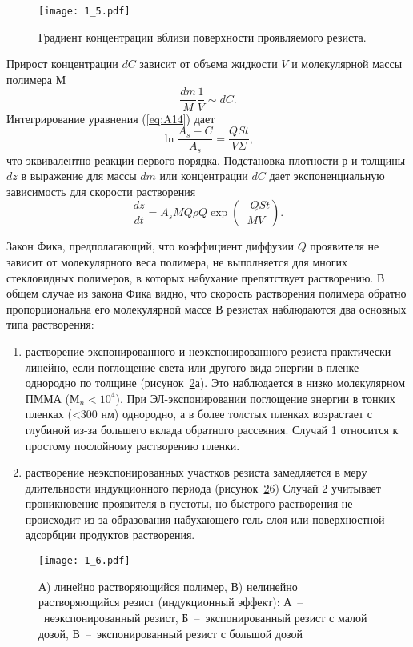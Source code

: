 \begin{figure}[H]
\center
\texttt{[image: 1\_5.pdf]}
\caption{Градиент концентрации вблизи поверхности проявляемого резиста.}
\label{fig:5}
\end{figure}

Прирост концентрации $dC$ зависит от объема жидкости $V$ и молекулярной массы полимера $М$
\begin{equation}
\frac{dm}{M}\frac{1}{V} \sim dC.
\label{eq:A15}
\end{equation}
Интегрирование уравнения (\ref{eq:A14}) дает
\begin{equation}
\ln\frac{A_s-C}{A_s} = \frac{QSt}{V\Sigma},
\label{eq:A16}
\end{equation}
что эквивалентно реакции первого порядка. Подстановка плотности $р$ и толщины $dz$ в выражение для массы $dm$ или концентрации $dC$ дает экспоненциальную зависимость для скорости растворения
\begin{equation}
\frac{dz}{dt} = A_s MQ \rho Q \exp\left(\frac{-QSt}{MV}\right).
\label{eq:A17}
\end{equation}

Закон Фика, предполагающий, что коэффициент диффузии $Q$ проявителя не зависит от молекулярного веса полимера, не выполняется для многих стекловидных полимеров, в которых набухание препятствует растворению.
В общем случае из закона Фика видно, что скорость растворения полимера обратно пропорциональна его молекулярной массе В резистах наблюдаются два основных типа растворения:
\begin{enumerate}
    \item растворение экспонированного и неэкспонированного резиста практически линейно, если поглощение света или другого вида энергии в пленке однородно по толщине (рисунок~\ref{fig:6}а). Это наблюдается в низко молекулярном ПММА ($М_n<10^4$). При ЭЛ-экспонировании поглощение энергии в тонких пленках (<300 нм) однородно, а в более толстых пленках возрастает с глубиной из-за большего вклада обратного рассеяния. Случай 1 относится к простому послойному растворению пленки.
    \item растворение неэкспонированных участков резиста замедляется в меру длительности индукционного периода (рисунок~\ref{fig:6}6)  Случай 2 учитывает проникновение проявителя в пустоты, но быстрого растворения не происходит из-за образования набухающего гель-слоя или поверхностной адсорбции продуктов растворения. 
\end{enumerate}
\begin{figure}[H]
\center
\texttt{[image: 1\_6.pdf]}
\caption{А) линейно растворяющийся полимер, В) нелинейно растворяющийся резист (индукционный эффект): А~--~неэкспонированный резист, Б~--~экспонированный резист с малой дозой, В~--~экспонированный резист с большой дозой}
\label{fig:6}
\end{figure}

